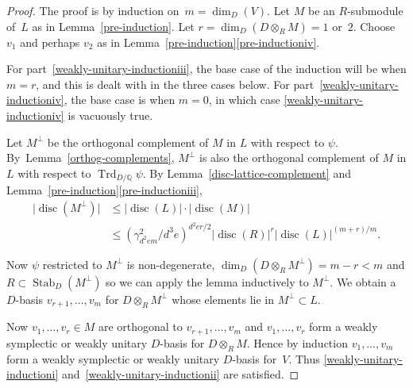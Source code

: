 \documentclass[11pt]{article}
\numberwithin{equation}{section}
\newcommand{\bQ}{\mathbb{Q}}
\DeclareMathOperator{\disc}{disc}
\DeclareMathOperator{\Stab}{Stab}
\DeclareMathOperator{\Trd}{Trd}
\newcommand{\abs}[1]{\lvert #1 \rvert}
\begin{document}
\begin{proof}
The proof is by induction on~$m = \dim_D(V)$.
Let $M$ be an $R$-submodule of~$L$ as in Lemma~\ref{pre-induction}.
Let $r = \dim_D(D \otimes_R M) = 1$ or~$2$.
Choose $v_1$ and perhaps $v_2$ as in Lemma~\ref{pre-induction}\eqref{pre-inductioniv}.

For part~\eqref{weakly-unitary-inductioniii}, the base case of the induction will be when $m=r$, and this is dealt with in the three cases below.
For part~\eqref{weakly-unitary-inductioniv}, the base case is when $m=0$, in which case \eqref{weakly-unitary-inductioniv} is vacuously true.

Let $M^\perp$ be the orthogonal complement of $M$ in $L$ with respect to $\psi$.
By~Lem\-ma~\ref{orthog-complements}, $M^\perp$ is also the orthogonal complement of $M$ in $L$ with respect to $\Trd_{D/\bQ} \psi$.
By Lemma~\ref{disc-lattice-complement} and Lemma~\ref{pre-induction}\eqref{pre-inductioniii},\vspace*{-3pt}\enlargethispage{.5\baselineskip}
\begin{equation} \label{eqn:disc-Mperp}
\begin{split}
\abs{\disc(M^\perp)} &\leq \abs{\disc(L)} \cdot \abs{\disc(M)}\\
&\leq (\gamma_{d^2em}^2/d^3e)^{d^2er/2} \abs{\disc(R)}^r \abs{\disc(L)}^{(m+r)/m}.
\end{split}
\end{equation}

Now $\psi$ restricted to $M^\perp$ is non-degenerate, $\dim_D(D \otimes_R M^\perp) = m-r < m$ and $R \subset \Stab_D(M^\perp)$ so we can apply the lemma inductively to $M^\perp$.
We obtain a $D$-basis $v_{r+1}, \dotsc, v_m$ for $D \otimes_R M^\perp$ whose elements lie in $M^\perp \subset L$.

Now $v_1, \dotsc, v_r \in M$ are orthogonal to $v_{r+1}, \dotsc, v_m$ and $v_1, \dotsc, v_r$ form a weakly symplectic or weakly unitary $D$-basis for $D \otimes_R M$.
Hence by induction $v_1, \dotsc, v_m$ form a weakly symplectic or weakly unitary $D$-basis for~$V$.
Thus \eqref{weakly-unitary-inductioni} and~\eqref{weakly-unitary-inductionii} are satisfied.


\end{proof}
\end{document}

